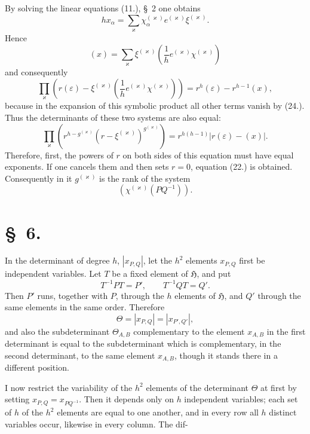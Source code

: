 \documentclass[11pt]{article}
\newcommand{\grp}{\mathfrak{H}}
\begin{document}
By solving the linear equations (11.), \S~2 one obtains
\begin{equation*}\tag{26.}
hx_\alpha=\sum_\varkappa \chi_\alpha^{(\varkappa)}e^{(\varkappa)}\xi^{(\varkappa)}.
\end{equation*}
Hence
\begin{equation*}\tag{27.}
(x)=\sum_\varkappa \xi^{(\varkappa)}\left(\frac{1}{h}e^{(\varkappa)}\chi^{(\varkappa)}\right)
\end{equation*}
and consequently
\[
\prod_\varkappa\left(r(\varepsilon)-\xi^{(\varkappa)}\left(\frac{1}{h}e^{(\varkappa)}\chi^{(\varkappa)}\right)\right)=r^h(\varepsilon)-r^{h-1}(x),
\]
because in the expansion of this symbolic product all other terms vanish by (24.). Thus the determinants of these two systems are also equal:
\[
\prod_\varkappa\left(r^{h-g^{(\varkappa)}}(r-\xi^{(\varkappa)})^{g^{(\varkappa)}}\right)=r^{h(h-1)}\left|r(\varepsilon)-(x)\right|.
\]
Therefore, first, the powers of $r$ on both sides of this equation must have equal exponents. If one cancels them and then sets $r=0$, equation (22.) is obtained. Consequently in it $g^{(\varkappa)}$ is the rank of the system
\begin{equation*}\tag{28.}
\left(\chi^{(\varkappa)}(PQ^{-1})\right).
\end{equation*}

\section*{\S~6.}

In the determinant of degree $h$, $\left|x_{P,Q}\right|$, let the $h^2$ elements $x_{P,Q}$ first be independent variables. Let $T$ be a fixed element of $\grp$, and put
\[
T^{-1}PT=P',\qquad T^{-1}QT=Q'.
\]
Then $P'$ runs, together with $P$, through the $h$ elements of $\grp$, and $Q'$ through the same elements in the same order. Therefore
\begin{equation*}\tag{1.}
\Theta=\left|x_{P,Q}\right|=\left|x_{P',Q'}\right|,
\end{equation*}
and also the subdeterminant $\Theta_{A,B}$ complementary to the element $x_{A,B}$ in the first determinant is equal to the subdeterminant which is complementary, in the second determinant, to the same element $x_{A,B}$, though it stands there in a different position.

I now restrict the variability of the $h^2$ elements of the determinant $\Theta$ at first by setting $x_{P,Q}=x_{PQ^{-1}}$. Then it depends only on $h$ independent variables; each set of $h$ of the $h^2$ elements are equal to one another, and in every row all $h$ distinct variables occur, likewise in every column. The dif-
\end{document}
